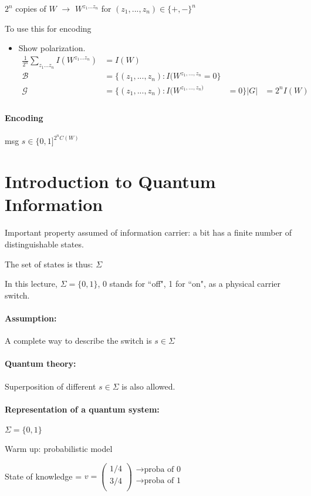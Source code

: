 \documentclass{article}
\begin{document}
$2^n$ copies of $W$ $\to$ $W^{z_1...z_n}$ for $(z_1,...,z_n)\in \{+,-\}^n$

To use this for encoding
\begin{itemize}
\item Show polarization.
\begin{align*}
\frac{1}{2^n}\sum_{z_1...z_n}I(W^{z_1...z_n})&=I(W)\\
\mathcal{B} & = \{ (z_1,...,z_n): I(W^{z_1,...,z_n}=0\}\\
\mathcal{G} & = \{ (z_1,...,z_n): I(W^{z_1,...,z_n)}&=0\}
|G|&=2^nI(W)\\
\end{align*}
\end{itemize}

\paragraph{Encoding} msg $s\in \{0,1]^{2^nC(W)}$


\section{Introduction to Quantum Information}
Important property assumed of information carrier: a bit has a finite number of distinguishable states.

The set of states is thus: $\Sigma$

In this lecture, $\Sigma=\{0,1\}$, 0 stands for ``off", 1 for ``on", as a physical carrier switch.

\paragraph{Assumption:} A complete way to describe the switch is $s\in \Sigma$


\bigskip

\paragraph{Quantum theory:} Superposition of different $s\in \Sigma$ is also allowed.

\paragraph{Representation of a quantum system:}
$\Sigma = \{0,1\}$

Warm up: probabilistic model


State of knowledge = $v = \begin{pmatrix}
1/4\\ 3/4\\
\end{pmatrix}
\begin{matrix}
\to \text{proba of 0}\\
\to \text{proba of 1}\\
\end{matrix}
$
\end{document}
